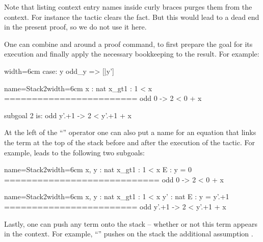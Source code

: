 Note that listing context entry names inside curly braces purges them
from the context. For instance the tactic 
clears the  fact. But this would lead to a dead end in the
present proof, so we do not use it here.


One can combine \C{:} and \C{=>} around a proof command, to first prepare the
goal for its execution and finally apply the necessary bookkeeping to the
result.  For example:

\begin{coq-left}{}{width=6cm}
case: y odd_y => [|y']
$~$
$~$
$~$
$~$
$~$
$~$
\end{coq-left}
\begin{coqout-right}{name=Stack2}{width=6cm}
  x : nat
  x_gt1 : 1 < x
  ========================
   odd 0 -> 2 < 0 + x

subgoal 2 is:
 odd y'.+1 -> 2 < y'.+1 + x
\end{coqout-right}

At the left of the ``\C{:}'' operator one can also put a name for an
equation that links the term at the top of the stack before and
after the execution of the tactic. For example,
  leads to
the following two subgoals:

\begin{coqout}{name=Stack2}{width=6cm}
 x, y : nat
 x_gt1 : 1 < x
 E : y = 0
============================
 odd 0 -> 2 < 0 + x
\end{coqout}
\begin{coqout}{name=Stack2}{width=6cm}
 x, y : nat
 x_gt1 : 1 < x
 y' : nat
 E : y = y'.+1
========================
 odd y'.+1 -> 2 < y'.+1 + x
\end{coqout}

Lastly, one can push any term onto the stack -- whether or not this
term appears in the context. For example,
``'' pushes on the stack
the additional assumption .


